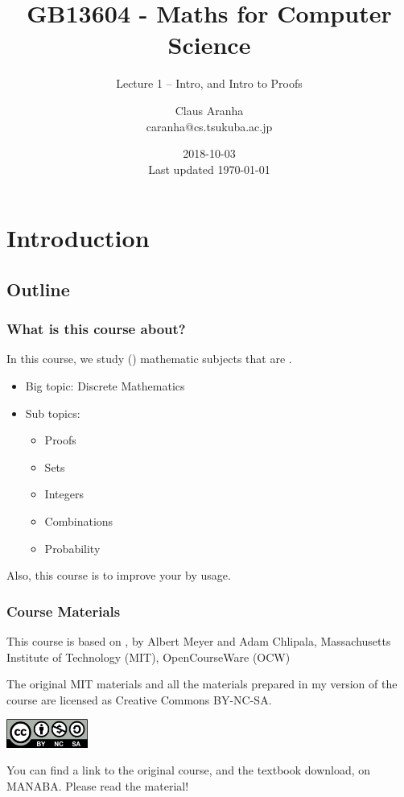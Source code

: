 \documentclass{beamer}
\title[GB13604]{GB13604 - Maths for Computer Science}
\subtitle[]{Lecture 1 -- Intro, and Intro to Proofs}
\author[Claus Aranha]{Claus Aranha\\{\footnotesize caranha@cs.tsukuba.ac.jp}}
\institute[COINS]{College of Information Science}
\date[2018-10-03]{2018-10-03\\{\tiny Last updated \today}}
\begin{document}
\section{Introduction}
\subsection{Outline}

\begin{frame}
  \maketitle
\end{frame}

\begin{frame}
  \frametitle{What is this course about?}

  In this course, we study () mathematic
  subjects that are .

  \vfill
  
  \begin{itemize}
  \item Big topic: Discrete Mathematics
  \item Sub topics:
    \begin{itemize}
    \item Proofs
    \item Sets
    \item Integers
    \item Combinations
    \item Probability
    \end{itemize}
  \end{itemize}

  
  \bigskip

  Also, this course  is to improve your
   by usage.
\end{frame}


\begin{frame}
  \frametitle{Course Materials}

  
  This course is based on , by Albert Meyer and Adam Chlipala, Massachusetts
  Institute of Technology (MIT), OpenCourseWare (OCW)

  \bigskip

  The original MIT materials and all the materials prepared in my
  version of the course are licensed as Creative Commons BY-NC-SA.
  
  \bigskip
  
  \begin{center}
    \includegraphics[width=0.2\textwidth]{../img/by-nc-sa}
  \end{center}

  \bigskip

  You can find a link to the original course, and the textbook
  download, on MANABA. \alert{Please read the material!}
\end{frame}
\end{document}
